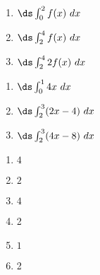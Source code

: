 {\noindent
\begin{minipage}{\linewidth}
\end{minipage}
\noindent\begin{minipage}[t]{.49\linewidth}
\begin{enumerate}
\item		$\ds \int_0^2 f(x)\ dx$
\item		$\ds \int_2^4 f(x)\ dx$
\item		$\ds \int_2^4 2f(x)\ dx$
\end{enumerate}
\end{minipage}
\begin{minipage}[t]{.49\linewidth}
\begin{enumerate}\addtocounter{enumii}{3}
\item		$\ds \int_0^1 4x\ dx$
\item		$\ds \int_2^3 (2x-4)\ dx$
\item		$\ds \int_2^3 (4x-8)\ dx$
\end{enumerate}
\end{minipage}
}
{\begin{enumerate}
\item		$4$
\item		$2$
\item		$4$
\item		2
\item		$1$
\item		2
\end{enumerate}
}


